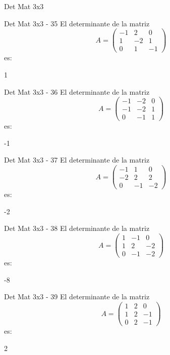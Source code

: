\documentclass[a4,11pt]{aleph-notas}
\begin{document}
\begin{quiz}{Det Mat 3x3}
\begin{numerical}[tolerance=0]%
    {Det Mat 3x3 - 35}
    El determinante de la matriz
    \[
        A = \begin{pmatrix} -1 & 2 & 0 \\ 1 & -2 & 1 \\ 0 & 1 & -1 \end{pmatrix}
    \]
    es:
    \item[] 1
\end{numerical}

\begin{numerical}[tolerance=0]%
    {Det Mat 3x3 - 36}
    El determinante de la matriz
    \[
        A = \begin{pmatrix} -1 & -2 & 0 \\ -1 & -2 & 1 \\ 0 & -1 & 1 \end{pmatrix}
    \]
    es:
    \item[] -1
\end{numerical}

\begin{numerical}[tolerance=0]%
    {Det Mat 3x3 - 37}
    El determinante de la matriz
    \[
        A = \begin{pmatrix} -1 & 1 & 0 \\ -2 & 2 & 2 \\ 0 & -1 & -2 \end{pmatrix}
    \]
    es:
    \item[] -2
\end{numerical}

\begin{numerical}[tolerance=0]%
    {Det Mat 3x3 - 38}
    El determinante de la matriz
    \[
        A = \begin{pmatrix} 1 & -1 & 0 \\ 1 & 2 & -2 \\ 0 & -1 & -2 \end{pmatrix}
    \]
    es:
    \item[] -8
\end{numerical}

\begin{numerical}[tolerance=0]%
    {Det Mat 3x3 - 39}
    El determinante de la matriz
    \[
        A = \begin{pmatrix} 1 & 2 & 0 \\ 1 & 2 & -1 \\ 0 & 2 & -1 \end{pmatrix}
    \]
    es:
    \item[] 2
\end{numerical}


\end{quiz}
\end{document}
